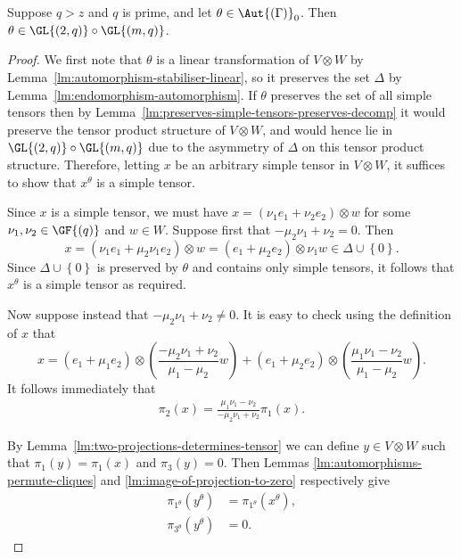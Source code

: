 \begin{lemma} \label{lm:automorphism-stabiliser-fixes-tensor-decomposition}
Suppose $q > z$ and $q$ is prime, and let $\theta \in \Aut{\left(\Gamma \right)}_0$. Then $\theta \in \GL{\left(2, q \right)} \circ \GL{\left(m, q \right)}$.
\end{lemma}
\begin{proof}
We first note that $\theta$ is a linear transformation of $V \otimes W$ by Lemma~\ref{lm:automorphism-stabiliser-linear}, so it preserves the set $\Delta$ by Lemma~\ref{lm:endomorphism-automorphism}. If $\theta$ preserves the set of all simple tensors then by Lemma~\ref{lm:preserves-simple-tensors-preserves-decomp} it would preserve the tensor product structure of $V \otimes W$, and would hence lie in $\GL{\left(2, q \right)} \circ \GL{\left(m, q \right)}$ due to the asymmetry of $\Delta$ on this tensor product structure. Therefore, letting $x$ be an arbitrary simple tensor in $V \otimes W$, it suffices to show that $x^\theta$ is a simple tensor.

Since $x$ is a simple tensor, we must have $x = \left(\nu_1 e_1 + \nu_2 e_2 \right) \otimes w$ for some $\nu_1, \nu_2 \in \GF{\left(q \right)}$ and $w \in W$. Suppose first that $-\mu_2 \nu_1 + \nu_2 = 0$. Then
\begin{displaymath}
    x = \left(\nu_1 e_1 + \mu_2 \nu_1 e_2 \right) \otimes w = \left(e_1 + \mu_2 e_2 \right) \otimes \nu_1 w \in \Delta \cup {\left\{0 \right\}}.
\end{displaymath}
Since $\Delta \cup \left\{0 \right\}$ is preserved by $\theta$ and contains only simple tensors, it follows that $x^\theta$ is a simple tensor as required.

Now suppose instead that $-\mu_2 \nu_1 + \nu_2 \neq 0$. It is easy to check using the definition of $x$ that
\begin{displaymath}
    x = \left(e_1 + \mu_1 e_2 \right) \otimes \left(\frac{-\mu_2 \nu_1 + \nu_2}{\mu_1 - \mu_2} w \right) + \left(e_1 + \mu_2 e_2 \right) \otimes {\left(\frac{\mu_1 \nu_1 - \nu_2}{\mu_1 - \mu_2} w \right)}.
\end{displaymath}
It follows immediately that
\begin{align}
    \pi_2{\left(x \right)} = \frac{\mu_1 \nu_1 - \nu_2}{-\mu_2 \nu_1 + \nu_2} \pi_1{\left(x \right)}. \label{eqn:projection-ratio}
\end{align}

By Lemma~\ref{lm:two-projections-determines-tensor} we can define $y \in V \otimes W$ such that $\pi_1{\left(y \right)} = \pi_1{\left(x \right)}$ and $\pi_3{\left(y \right)} = 0$. Then Lemmas \ref{lm:automorphisms-permute-cliques} and \ref{lm:image-of-projection-to-zero} respectively give
\begin{align}
    \pi_{1^\theta}{\left(y^\theta \right)} &= \pi_{1^\theta}{\left(x^\theta \right)}, \label{eqn:matching-projection-1-image} \\
    \pi_{3^\theta}{\left(y^\theta \right)} &= 0. \label{eqn:projection-3-image-zero}
\end{align}


\end{proof}
